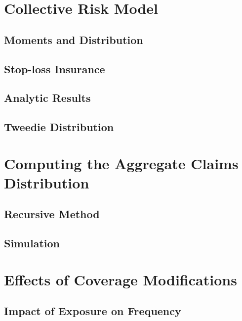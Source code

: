 \documentclass[]{book}
\theoremstyle{definition}
\theoremstyle{definition}
\theoremstyle{definition}
\theoremstyle{remark}
\begin{document}
\section{Collective Risk Model}\label{collective-risk-model}

\subsection{Moments and Distribution}\label{moments-and-distribution}

\subsection{Stop-loss Insurance}\label{stop-loss-insurance}

\subsection{Analytic Results}\label{analytic-results}

\subsection{Tweedie Distribution}\label{tweedie-distribution}

\section{Computing the Aggregate Claims
Distribution}\label{computing-the-aggregate-claims-distribution}

\subsection{Recursive Method}\label{recursive-method}

\subsection{Simulation}\label{simulation}

\section{Effects of Coverage
Modifications}\label{effects-of-coverage-modifications}

\subsection{Impact of Exposure on
Frequency}\label{impact-of-exposure-on-frequency}
\end{document}
